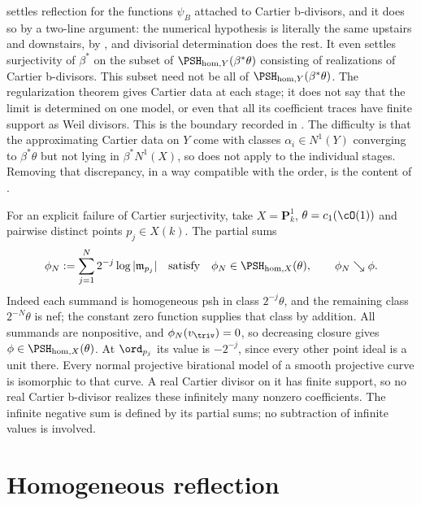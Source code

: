 \begin{remark}
\label{rem:ch39-cartier-not-enough}
 settles reflection for the functions
$\psi_B$ attached to Cartier b-divisors, and it does so by a two-line
argument: the numerical hypothesis is literally the same upstairs and
downstairs, by , and divisorial determination
does the rest.  It even settles surjectivity of $\beta^*$ on the subset of
$\PSH_{\mathrm{hom},Y}(\beta^*\theta)$ consisting of realizations of
Cartier b-divisors.  This subset need not be all of
$\PSH_{\mathrm{hom},Y}(\beta^*\theta)$.  The regularization theorem gives
Cartier data at each stage; it does not say that the limit is determined on
one model, or even that all its coefficient traces have finite support as
Weil divisors.  This is the boundary recorded in
.  The difficulty is that the approximating Cartier data on $Y$ come
with classes $\alpha_i\in N^1(Y)$ converging to $\beta^*\theta$ but not
lying in $\beta^*N^1(X)$, so  does not apply to
the individual stages.  Removing that discrepancy, in a way compatible with
the order, is the content of .

For an explicit failure of Cartier surjectivity, take $X=\mathbf P^1_k$,
$\theta=c_1(\cO(1))$ and pairwise distinct points $p_j\in X(k)$.
The partial sums
\[
 \phi_N:=\sum_{j=1}^N2^{-j}\log|\mathfrak m_{p_j}|
 \quad\text{satisfy}\quad
 \phi_N\in\PSH_{\mathrm{hom},X}(\theta),\qquad \phi_N\searrow\phi .
\]
Indeed each summand is homogeneous psh in class $2^{-j}\theta$,
and the remaining class $2^{-N}\theta$ is nef; the constant zero
function supplies that class by addition.  All summands are nonpositive,
and $\phi_N(v_{\triv})=0$, so decreasing closure gives
$\phi\in\PSH_{\mathrm{hom},X}(\theta)$.  At $\ord_{p_j}$ its value is
$-2^{-j}$, since every other point ideal is a unit there.  Every normal
projective birational model of a smooth projective curve is isomorphic to
that curve.  A real Cartier divisor on it has finite support, so no real
Cartier b-divisor realizes these infinitely many nonzero coefficients.
The infinite negative sum is defined by its partial sums; no subtraction
of infinite values is involved.
\end{remark}

\section{Homogeneous reflection}
\label{sec:ch39-homogeneous}

